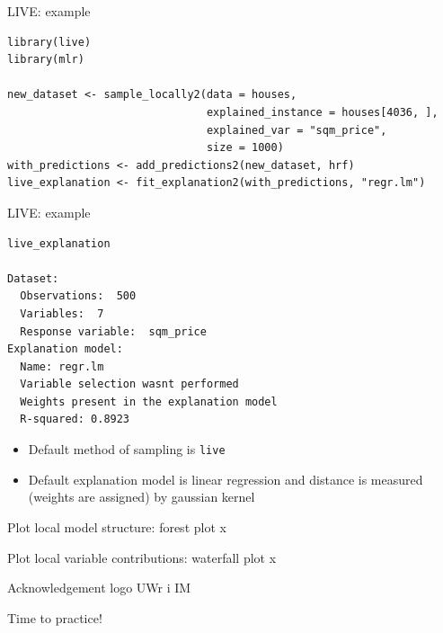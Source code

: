 \documentclass[xcolor={dvipsnames}]{beamer}
\begin{document}
\begin{frame}[fragile]{LIVE: example}
\begin{lstlisting}
library(live)
library(mlr)

new_dataset <- sample_locally2(data = houses,
                               explained_instance = houses[4036, ],
                               explained_var = "sqm_price",
                               size = 1000)
with_predictions <- add_predictions2(new_dataset, hrf)
live_explanation <- fit_explanation2(with_predictions, "regr.lm")
\end{lstlisting}
\end{frame}

\begin{frame}[fragile]{LIVE: example}
\begin{lstlisting}
live_explanation

Dataset: 
  Observations:  500 
  Variables:  7 
  Response variable:  sqm_price 
Explanation model: 
  Name: regr.lm 
  Variable selection wasnt performed 
  Weights present in the explanation model 
  R-squared: 0.8923
\end{lstlisting}
\begin{itemize}
	\item Default method of sampling is \texttt{live}
	\item Default explanation model is linear regression and distance is measured (weights are assigned) by gaussian kernel
\end{itemize}
\end{frame}

\begin{frame}[fragile]{Plot local model structure: forest plot}
	x
\end{frame}

\begin{frame}[fragile]{Plot local variable contributions: waterfall plot}
	x
\end{frame}

\begin{frame}{Acknowledgement}
	 logo UWr i IM
\end{frame} 


\begin{frame}{Time to practice!}
  
\end{frame}
\end{document}
